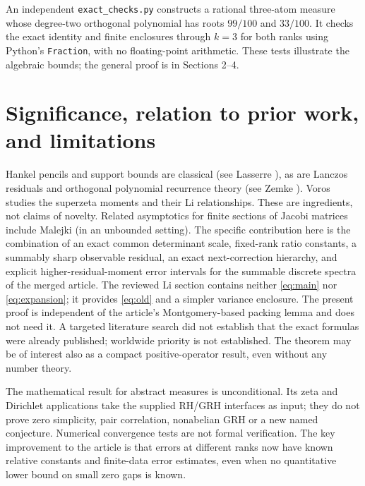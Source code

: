 \documentclass[11pt]{article}
\theoremstyle{remark}\newtheorem{remark}[theorem]{Remark}
\begin{document}
An independent \texttt{exact\_checks.py} constructs a rational three-atom measure whose degree-two orthogonal polynomial has roots $99/100$ and $33/100$. It checks the exact identity and finite enclosures through $k=3$ for both ranks using Python's \texttt{Fraction}, with no floating-point arithmetic. These tests illustrate the algebraic bounds; the general proof is in Sections 2--4.

\section{Significance, relation to prior work, and limitations}
Hankel pencils and support bounds are classical (see Lasserre \cite{lasserre}), as are Lanczos residuals and orthogonal polynomial recurrence theory (see Zemke \cite{zemke}). Voros \cite{voros} studies the superzeta moments and their Li relationships. These are ingredients, not claims of novelty. Related asymptotics for finite sections of Jacobi matrices include Malejki \cite{malejki} (in an unbounded setting). The specific contribution here is the combination of an exact common determinant scale, fixed-rank ratio constants, a summably sharp observable residual, an exact next-correction hierarchy, and explicit higher-residual-moment error intervals for the summable discrete spectra of the merged article. The reviewed Li section contains neither \eqref{eq:main} nor \eqref{eq:expansion}; it provides \eqref{eq:old} and a simpler variance enclosure. The present proof is independent of the article's Montgomery-based packing lemma and does not need it. A targeted literature search did not establish that the exact formulas were already published; worldwide priority is not established. The theorem may be of interest also as a compact positive-operator result, even without any number theory.

The mathematical result for abstract measures is unconditional. Its zeta and Dirichlet applications take the supplied RH/GRH interfaces as input; they do not prove zero simplicity, pair correlation, nonabelian GRH or a new named conjecture. Numerical convergence tests are not formal verification. The key improvement to the article is that errors at different ranks now have known relative constants and finite-data error estimates, even when no quantitative lower bound on small zero gaps is known.
\end{document}
